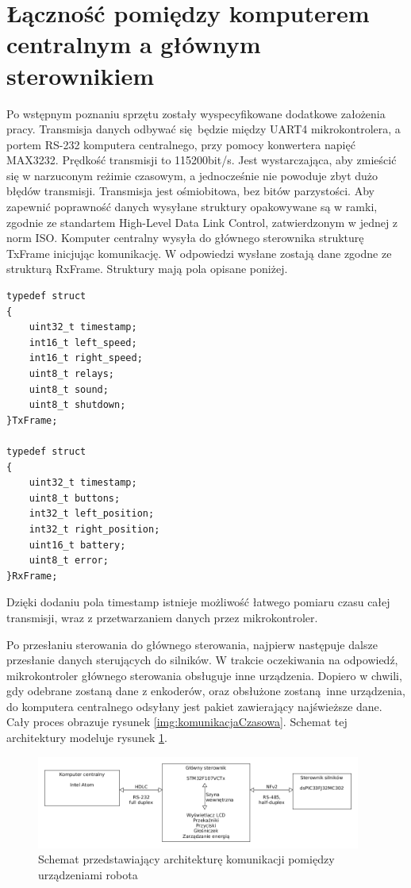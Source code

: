 \documentclass[a4paper, 12pt]{article}
\begin{document}
	\section{Łączność pomiędzy komputerem centralnym a głównym sterownikiem}
	Po wstępnym poznaniu sprzętu zostały wyspecyfikowane dodatkowe założenia pracy. Transmisja danych odbywać się będzie między UART4 mikrokontrolera, a portem RS-232 komputera centralnego, przy pomocy konwertera napięć MAX3232. Prędkość transmisji to 115200bit/s. Jest wystarczająca, aby zmieścić się w narzuconym reżimie czasowym, a jednocześnie nie powoduje zbyt dużo błędów transmisji. Transmisja jest ośmiobitowa, bez bitów parzystości. Aby zapewnić poprawność danych wysyłane struktury opakowywane są w ramki, zgodnie ze standartem High-Level Data Link Control, zatwierdzonym w jednej z norm ISO. Komputer centralny wysyła do głównego sterownika strukturę TxFrame inicjując komunikację. W odpowiedzi wysłane zostają dane zgodne ze strukturą RxFrame. Struktury mają pola opisane poniżej.
	\begin{lstlisting}
typedef struct 
{
	uint32_t timestamp;
	int16_t left_speed;
	int16_t right_speed;
	uint8_t relays;
	uint8_t sound;
	uint8_t shutdown;
}TxFrame;

typedef struct
{
	uint32_t timestamp;
	uint8_t buttons;
	int32_t left_position;
	int32_t right_position;
	uint16_t battery;
	uint8_t error;
}RxFrame;
	\end{lstlisting}
	Dzięki dodaniu pola timestamp istnieje możliwość łatwego pomiaru czasu całej transmisji, wraz z przetwarzaniem danych przez mikrokontroler.\par Po przesłaniu sterowania do głównego sterowania, najpierw następuje dalsze przesłanie danych sterujących do silników. W trakcie oczekiwania na odpowiedź, mikrokontroler głównego sterowania obsługuje inne urządzenia. Dopiero w chwili, gdy odebrane zostaną dane z enkoderów, oraz obsłużone zostaną inne urządzenia, do komputera centralnego odsyłany jest pakiet zawierający najświeższe dane. Cały proces obrazuje rysunek \ref{img:komunikacjaCzasowa}. Schemat tej architektury modeluje rysunek \ref{img:komunikacja}. 
	\begin{figure}[ht]
	    \centering
	    \includegraphics[width=0.95\textwidth]{schemat_komunikacji}
	    \caption{Schemat przedstawiający architekturę komunikacji pomiędzy urządzeniami robota}
	    \label{img:komunikacja}
	\end{figure}
\end{document}
